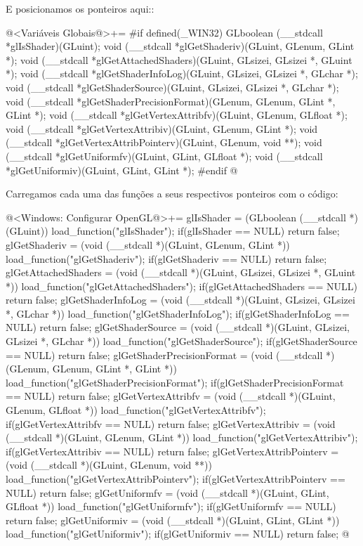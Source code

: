 E posicionamos os ponteiros aqui::

\iniciocodigo
@<Variáveis Globais@>+=
#if defined(_WIN32)
GLboolean (__stdcall *glIsShader)(GLuint);
void (__stdcall *glGetShaderiv)(GLuint, GLenum, GLint *);
void (__stdcall *glGetAttachedShaders)(GLuint, GLsizei, GLsizei *, GLuint *);
void (__stdcall *glGetShaderInfoLog)(GLuint, GLsizei, GLsizei *, GLchar *);
void (__stdcall *glGetShaderSource)(GLuint, GLsizei, GLsizei *, GLchar *);
void (__stdcall *glGetShaderPrecisionFormat)(GLenum, GLenum, GLint *, GLint *);
void (__stdcall *glGetVertexAttribfv)(GLuint, GLenum, GLfloat *);
void (__stdcall *glGetVertexAttribiv)(GLuint, GLenum, GLint *);
void (__stdcall *glGetVertexAttribPointerv)(GLuint, GLenum, void **);
void (__stdcall *glGetUniformfv)(GLuint, GLint, GLfloat *);
void (__stdcall *glGetUniformiv)(GLuint, GLint, GLint *);
#endif
@
\fimcodigo

Carregamos cada uma das funções a seus respectivos ponteiros com o
código:

\iniciocodigo
@<Windows: Configurar OpenGL@>+=
glIsShader = (GLboolean (__stdcall *)(GLuint)) load_function("glIsShader");
if(glIsShader == NULL) return false;
glGetShaderiv = (void (__stdcall *)(GLuint, GLenum, GLint *))
                   load_function("glGetShaderiv");
if(glGetShaderiv == NULL) return false;
glGetAttachedShaders = (void (__stdcall *)(GLuint, GLsizei, GLsizei *, GLuint *))
                         load_function("glGetAttachedShaders");
if(glGetAttachedShaders == NULL) return false;
glGetShaderInfoLog = (void (__stdcall *)(GLuint, GLsizei, GLsizei *, GLchar *))
                         load_function("glGetShaderInfoLog");
if(glGetShaderInfoLog == NULL)  return false;
glGetShaderSource = (void (__stdcall *)(GLuint, GLsizei, GLsizei *, GLchar *))
                       load_function("glGetShaderSource");
if(glGetShaderSource == NULL) return false;
glGetShaderPrecisionFormat = (void (__stdcall *)(GLenum, GLenum, GLint *,
                                                 GLint *))
                                load_function("glGetShaderPrecisionFormat");
if(glGetShaderPrecisionFormat == NULL) return false;
glGetVertexAttribfv = (void (__stdcall *)(GLuint, GLenum, GLfloat *))
                         load_function("glGetVertexAttribfv");
if(glGetVertexAttribfv == NULL) return false;
glGetVertexAttribiv = (void (__stdcall *)(GLuint, GLenum, GLint *))
                        load_function("glGetVertexAttribiv");
if(glGetVertexAttribiv == NULL) return false;
glGetVertexAttribPointerv = (void (__stdcall *)(GLuint, GLenum, void **))
                               load_function("glGetVertexAttribPointerv");
if(glGetVertexAttribPointerv == NULL) return false;
glGetUniformfv = (void (__stdcall *)(GLuint, GLint, GLfloat *))
                     load_function("glGetUniformfv");
if(glGetUniformfv == NULL) return false;
glGetUniformiv = (void (__stdcall *)(GLuint, GLint, GLint *))
                     load_function("glGetUniformiv");
if(glGetUniformiv == NULL) return false;
@
\fimcodigo

